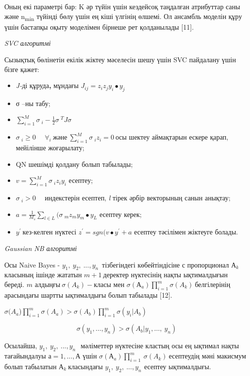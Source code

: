 \begin{multicols}{2}
Оның екі параметрі бар: K әр түйін үшін кездейсоқ таңдалған атрибуттар
саны және n\textsubscript{min} түйінді бөлу үшін ең кіші үлгінің өлшемі.
Ол ансамбль моделін құру үшін бастапқы оқыту моделімен бірнеше рет
қолданылады {[}11{]}.

\emph{SVC алгоритмі}

Сызықтық бөлінетін екілік жіктеу мәселесін шешу үшін SVC пайдалану үшін
бізге қажет:

\begin{itemize}
\item
  \emph{J-}ді құруда{\bfseries ,} мұндағы
  \(J_{ij} = z_{i}z_{j}y_{i} \bullet y_{j}\)
\item
  σ --ны табу;
\item
  \(\sum_{i = 1}^{M}{}{\sigma\ }_{i} - \frac{1}{2}{\sigma\ }^{T}J\sigma\ \)
\item
  \({\sigma\ }_{i} \geq 0\ \ \ \ \ \ \forall_{i}\ және\ \sum_{i = 1}^{M}{}{\sigma\ }_{i}z_{i} = 0\ \)осы
  шектеу аймақтарын ескере қарап, мейілінше жоғарылату;
\item
  QN шешімді қолдану болып табылады;
\item
  \(v = \sum_{i = 1}^{M}{}{\sigma\ }_{i}z_{i}y_{i}\) есептеу;
\item
  \({\sigma\ }_{i} > 0\ \ \ \ \ \ \)индекстерін есептеп, \emph{l} тірек
  әрбір векторының санын анықтау;
\item
  \(a = \frac{1}{M_{s}}\sum_{l \in L}^{}{}({\sigma\ }_{m}z_{m}y_{m} \bullet y_{L}\)
  есептеу керек;
\item
  \(y^{'}\ \)кез-келген нүктесі \(z^{'} = sgn(v \bullet y^{'} + a\)
  есептеу тәсілімен жіктеуге болады.
\end{itemize}

\emph{Gaussian NB алгоритмі}

Осы Naive Bayes - \(y_{1},\ y_{2},\ ...,y_{n\ }\) тізбегіндегі
көбейтіндісіне с пропорционал \(А_{k}\)класының ішінде жататын
\(m + 1\ \)деректер нүктесінің нақты ықтималдығын береді. \(m\)
алдыңғы\(\ \sigma\left( A_{k} \right) -\)класы мен
\(\sigma\left( А_{a} \right)\prod_{i = 1}^{m}{}\sigma\left( A_{k} \right)\ \)белгілерінің
арасындағы шартты ықтималдығы болып табылады {[}12{]}.

\(\sigma(A_{a}\))\(\prod_{i = 1}^{m}{}\sigma\left( A_{a} \right) > \sigma(A_{b})\prod_{i = 1}^{m}{}\sigma(y_{i}|A_{b})\)

\[\sigma\left( y_{1},\ldots,y_{n} \right) > \sigma(A_{b}|y_{1},\ldots,\ y_{n})\]

Осылайша, \(y_{1},\ y_{2},\ ...,y_{n\ }\ \) мәліметтер нүктесіне кластың
осы ең ықтимал нақты тағайындалуы \(а = 1,\ldots,А\) үшін
\(\sigma\left( А_{a} \right)\prod_{i = 1}^{m}{}\ \sigma\left( A_{k} \right)\ \)есептеудің
мәні макисмум болып табылатын \(А_{k}\ \)класындағы
\(y_{1},\ y_{2},\ ...,y_{n\ }\ \)есептеу ықтималдығы.


\end{multicols}
